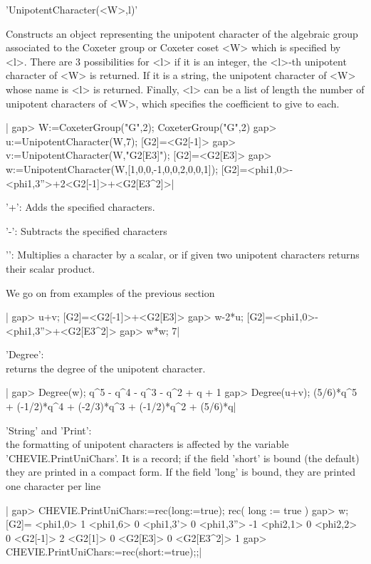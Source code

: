 
'UnipotentCharacter(<W>,l)'

Constructs  an object representing the unipotent character of the algebraic
group  associated  to  the  Coxeter  group  or  Coxeter  coset <W> which is
specified  by <l>. There are 3 possibilities for <l>\: if it is an integer,
the  <l>-th unipotent character of <W> is  returned. If it is a string, the
unipotent  character of <W> whose name is <l> is returned. Finally, <l> can
be  a  list  of  length  the  number  of unipotent characters of <W>, which
specifies the coefficient to give to each.

|    gap> W:=CoxeterGroup("G",2);
    CoxeterGroup("G",2)
    gap> u:=UnipotentCharacter(W,7);
    [G2]=<G2[-1]>
    gap> v:=UnipotentCharacter(W,"G2[E3]");
    [G2]=<G2[E3]>
    gap> w:=UnipotentCharacter(W,[1,0,0,-1,0,0,2,0,0,1]);
    [G2]=<phi{1,0}>-<phi{1,3}''>+2<G2[-1]>+<G2[E3^2]>|


'+': Adds the specified characters.

'-': Subtracts the specified characters

'\*': Multiplies a character by a scalar, or if given two unipotent characters
returns their scalar product.

We go on from examples of the previous section\:

|    gap> u+v;
    [G2]=<G2[-1]>+<G2[E3]>
    gap> w-2*u;
    [G2]=<phi{1,0}>-<phi{1,3}''>+<G2[E3^2]>
    gap> w*w;
    7|

'Degree':\\ returns the degree of the unipotent character.

|    gap> Degree(w);
    q^5 - q^4 - q^3 - q^2 + q + 1
    gap> Degree(u+v);
    (5/6)*q^5 + (-1/2)*q^4 + (-2/3)*q^3 + (-1/2)*q^2 + (5/6)*q|

'String' and 'Print':\\ the formatting of unipotent characters is affected
  by  the variable  'CHEVIE.PrintUniChars'. It  is a  record; if  the field
  'short' is bound (the default) they are printed in a compact form. If the
  field 'long' is bound, they are printed one character per line\:

|    gap> CHEVIE.PrintUniChars:=rec(long:=true);
    rec(
      long := true )
    gap> w;
    [G2]=
    <phi{1,0}>   1
    <phi{1,6}>   0
    <phi{1,3}'>  0
    <phi{1,3}''> -1
    <phi{2,1}>   0
    <phi{2,2}>   0
    <G2[-1]>     2
    <G2[1]>      0
    <G2[E3]>     0
    <G2[E3^2]>   1
    gap> CHEVIE.PrintUniChars:=rec(short:=true);;|

